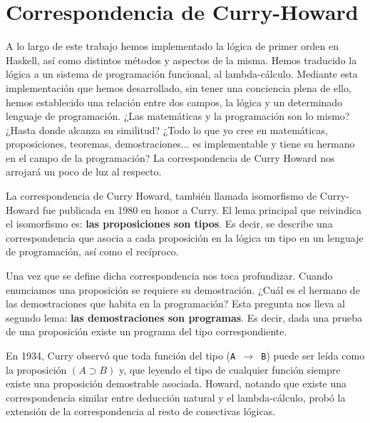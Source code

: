 \chapter{Correspondencia de Curry-Howard}

A lo largo de este trabajo hemos implementado la lógica de primer orden
en Haskell, así como distintos métodos y aspectos de la misma. Hemos
traducido la lógica a un sistema de programación funcional, al lambda-cálculo.
Mediante esta implementación que hemos desarrollado, sin tener una conciencia
plena de ello, hemos establecido una relación entre dos campos, la lógica y
un determinado lenguaje de programación. ¿Las matemáticas y la programación
son lo mismo? ¿Hasta donde alcanza su similitud? ¿Todo lo que yo cree en
matemáticas, proposiciones, teoremas, demostraciones... es implementable y
tiene su hermano en el campo de la programación? La correspondencia de Curry
Howard nos arrojará un poco de luz al respecto.

\vspace{5mm}

La correspondencia de Curry Howard, también llamada isomorfismo de Curry-Howard
fue publicada en 1980 en honor a Curry. El lema principal que reivindica el isomorfismo es:
\textbf{las proposiciones son tipos}. Es decir, se describe una correspondencia
que asocia a cada proposición en la lógica un tipo en un lenguaje de programación,
así como el recíproco.

\vspace{5mm}
Una vez que se define dicha correspondencia nos toca profundizar. Cuando
enunciamos una proposición se requiere su demostración. ¿Cuál es el hermano
de las demostraciones que habita en la programación? Esta pregunta nos lleva al segundo
lema: \textbf{las demostraciones son programas}. Es decir, dada una prueba de
una proposición existe un programa del tipo correspondiente.

\vspace{5mm}


En 1934, Curry observó que toda función del tipo (\texttt{A $\rightarrow$ B})
puede ser leída como la proposición $(A\supset B)$ y, que leyendo el tipo de
cualquier función siempre existe una proposición demostrable asociada. Howard,
notando que existe una correspondencia similar entre deducción natural y el
lambda-cálculo, probó la extensión de la correspondencia al resto de conectivas lógicas.

